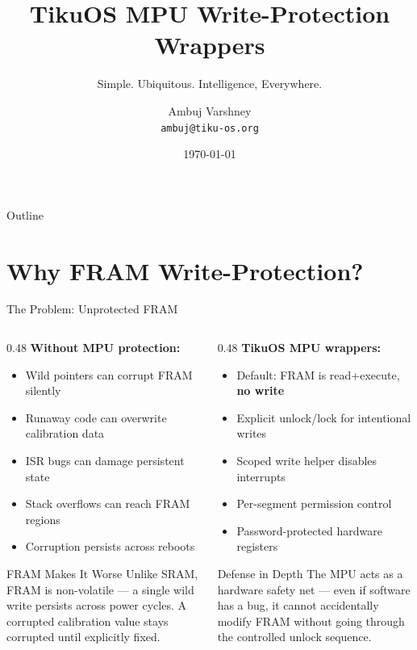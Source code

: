 \documentclass[aspectratio=169, 10pt]{beamer}
\title[TikuOS MPU]{TikuOS MPU Write-Protection Wrappers}
\subtitle{Simple. Ubiquitous. Intelligence, Everywhere.}
\author[Ambuj Varshney]{Ambuj Varshney \\ \texttt{ambuj@tiku-os.org}}
\date{\today}
\begin{document}
\begin{frame}
\titlepage
\end{frame}

\begin{frame}{Outline}
\tableofcontents
\end{frame}

\section{Why FRAM Write-Protection?}

\begin{frame}{The Problem: Unprotected FRAM}
\begin{columns}[T]
\begin{column}{0.48\textwidth}
\textbf{Without MPU protection:}
\begin{itemize}
  \item Wild pointers can corrupt FRAM silently
  \item Runaway code can overwrite calibration data
  \item ISR bugs can damage persistent state
  \item Stack overflows can reach FRAM regions
  \item Corruption persists across reboots
\end{itemize}

\vspace{0.5em}
\begin{alertblock}{FRAM Makes It Worse}
Unlike SRAM, FRAM is non-volatile --- a single wild write
persists across power cycles. A corrupted calibration value
stays corrupted until explicitly fixed.
\end{alertblock}
\end{column}

\begin{column}{0.48\textwidth}
\textbf{TikuOS MPU wrappers:}
\begin{itemize}
  \item Default: FRAM is read+execute, \textbf{no write}
  \item Explicit unlock/lock for intentional writes
  \item Scoped write helper disables interrupts
  \item Per-segment permission control
  \item Password-protected hardware registers
\end{itemize}

\vspace{0.5em}
\begin{block}{Defense in Depth}
The MPU acts as a hardware safety net --- even if software has
a bug, it cannot accidentally modify FRAM without going through
the controlled unlock sequence.
\end{block}
\end{column}
\end{columns}
\end{frame}
\end{document}
